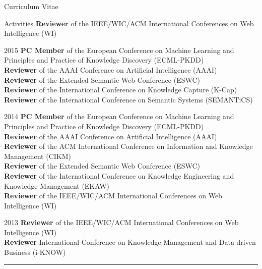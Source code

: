 \begin{cv}{\centerline{\LARGE Curriculum Vitae}}
\begin{cvlist}{Activities}
  \textbf{Reviewer} of the IEEE/WIC/ACM International Conferences on Web Intelligence (WI)
  \item[2015]  \textbf{PC Member} of the European Conference on Machine Learning and Principles and Practice of Knowledge Discovery (ECML-PKDD) \\
  \textbf{Reviewer} of the AAAI Conference on Artificial Intelligence (AAAI) \\
  \textbf{Reviewer} of the Extended Semantic Web Conference (ESWC) \\ 
  \textbf{Reviewer} of the International Conference on Knowledge Capture (K-Cap) \\
  \textbf{Reviewer} of the International Conference on Semantic Systems (SEMANTiCS)
\item[2014]  \textbf{PC Member} of the European Conference on Machine Learning and Principles and Practice of Knowledge Discovery (ECML-PKDD) \\
  \textbf{Reviewer} of the AAAI Conference on Artificial Intelligence (AAAI) \\
  \textbf{Reviewer} of the ACM International Conference on Information and Knowledge Management (CIKM) \\
  \textbf{Reviewer} of the Extended Semantic Web Conference (ESWC) \\ 
  \textbf{Reviewer} of the International Conference on Knowledge Engineering and Knowledge Management (EKAW) \\
  \textbf{Reviewer} of the IEEE/WIC/ACM International Conferences on Web Intelligence (WI)
\item[2013]  \textbf{Reviewer} of the IEEE/WIC/ACM International Conferences on Web Intelligence (WI) \\
  \textbf{Reviewer} International Conference on Knowledge Management and Data-driven Business (i-KNOW)
  \end{cvlist}

  \hrule
  

\end{cv}
